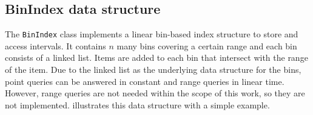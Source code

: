 	\subsection{BinIndex data structure}
	\label{subsec:binindex}
		
		The \texttt{BinIndex} class implements a linear bin-based index structure to store and access intervals.
		It contains $n$ many bins covering a certain range and each bin consists of a linked list.
		Items are added to each bin that intersect with the range of the item.
		Due to the linked list as the underlying data structure for the bins, point queries can be answered in constant and range queries in linear time.
		However, range queries are not needed within the scope of this work, so they are not implemented.
		 illustrates this data structure with a simple example.
		
